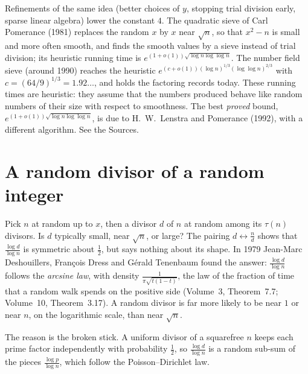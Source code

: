 \begin{remark}
Refinements of the same idea (better choices of $y$, stopping trial division early, sparse linear algebra) lower the constant $4$. The quadratic sieve of Carl Pomerance (1981) replaces the random $x$ by $x$ near $\sqrt n$, so that $x^2-n$ is small and more often smooth, and finds the smooth values by a sieve instead of trial division; its heuristic running time is $e^{(1+o(1))\sqrt{\log n\log\log n}}$. The number field sieve (around 1990) reaches the heuristic $e^{(c+o(1))(\log n)^{1/3}(\log\log n)^{2/3}}$ with $c=(64/9)^{1/3}=1.92\ldots$, and holds the factoring records today. These running times are heuristic: they assume that the numbers produced behave like random numbers of their size with respect to smoothness. The best \emph{proved} bound, $e^{(1+o(1))\sqrt{\log n\log\log n}}$, is due to H.~W.~Lenstra and Pomerance (1992), with a different algorithm. See the Sources.
\end{remark}

\section{A random divisor of a random integer}\label{sec:divisors}

Pick $n$ at random up to $x$, then a divisor $d$ of $n$ at random among its $\tau(n)$ divisors. Is $d$ typically small, near $\sqrt n$, or large? The pairing $d\leftrightarrow\frac nd$ shows that $\frac{\log d}{\log n}$ is symmetric about $\frac12$, but says nothing about its shape. In 1979 Jean-Marc Deshouillers, François Dress and Gérald Tenenbaum found the answer: $\frac{\log d}{\log n}$ follows the \emph{arcsine law}, with density $\frac1{\pi\sqrt{t(1-t)}}$, the law of the fraction of time that a random walk spends on the positive side (Volume~3, Theorem~7.7; Volume~10, Theorem~3.17). A random divisor is far more likely to be near $1$ or near $n$, on the logarithmic scale, than near $\sqrt n$.

The reason is the broken stick. A uniform divisor of a squarefree $n$ keeps each prime factor independently with probability $\frac12$, so $\frac{\log d}{\log n}$ is a random sub-sum of the pieces $\frac{\log p}{\log n}$, which follow the Poisson--Dirichlet law.

